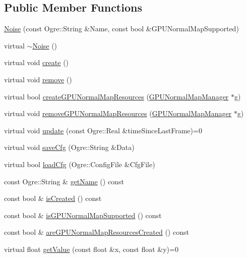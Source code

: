 \subsection*{Public Member Functions}
\begin{CompactItemize}
\item 
\hyperlink{class_hydrax_1_1_noise_1_1_noise_18d24fbe43250f986c5d5c57e1780f19}{Noise} (const Ogre::String \&Name, const bool \&GPUNormalMapSupported)
\item 
virtual \hyperlink{class_hydrax_1_1_noise_1_1_noise_4ff5ce1a68da081f11015cdc4b417f15}{$\sim$Noise} ()
\item 
virtual void \hyperlink{class_hydrax_1_1_noise_1_1_noise_be9cf8765feed765e6a35b0779125f6a}{create} ()
\item 
virtual void \hyperlink{class_hydrax_1_1_noise_1_1_noise_00c4aaa7604ea492740318d01f651606}{remove} ()
\item 
virtual bool \hyperlink{class_hydrax_1_1_noise_1_1_noise_59f0e03e88a5de69065838adc35ff2d8}{createGPUNormalMapResources} (\hyperlink{class_hydrax_1_1_g_p_u_normal_map_manager}{GPUNormalMapManager} $\ast$g)
\item 
virtual void \hyperlink{class_hydrax_1_1_noise_1_1_noise_9d3ca345d3f5b629e43ab276236d93b7}{removeGPUNormalMapResources} (\hyperlink{class_hydrax_1_1_g_p_u_normal_map_manager}{GPUNormalMapManager} $\ast$g)
\item 
virtual void \hyperlink{class_hydrax_1_1_noise_1_1_noise_9c32c4c630f193e034c074f69ea10f57}{update} (const Ogre::Real \&timeSinceLastFrame)=0
\item 
virtual void \hyperlink{class_hydrax_1_1_noise_1_1_noise_ac0a9fe1533ddd87467edb954f8abea8}{saveCfg} (Ogre::String \&Data)
\item 
virtual bool \hyperlink{class_hydrax_1_1_noise_1_1_noise_5ef6e71282a9dfcefc09e3ba84a7578f}{loadCfg} (Ogre::ConfigFile \&CfgFile)
\item 
const Ogre::String \& \hyperlink{class_hydrax_1_1_noise_1_1_noise_bd7bddafc148656d1a7782c94fb4a7aa}{getName} () const 
\item 
const bool \& \hyperlink{class_hydrax_1_1_noise_1_1_noise_94f5963b8f6fed2fb22149ff22e1166f}{isCreated} () const 
\item 
const bool \& \hyperlink{class_hydrax_1_1_noise_1_1_noise_20e13eb2f5cc93d384bb846b05d7aaeb}{isGPUNormalMapSupported} () const 
\item 
const bool \& \hyperlink{class_hydrax_1_1_noise_1_1_noise_e2260556005e5a5eaebae94d936b60c0}{areGPUNormalMapResourcesCreated} () const 
\item 
virtual float \hyperlink{class_hydrax_1_1_noise_1_1_noise_5b18138d5c2c5ea3c3659cef80dd3a3e}{getValue} (const float \&x, const float \&y)=0
\end{CompactItemize}
